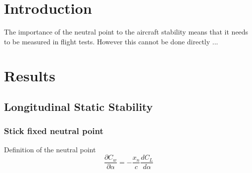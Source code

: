 \documentclass{article}
\begin{document}
\title{}
\author{lwp26}
\date{January 2025}
\maketitle

\section{Introduction}

The importance of the neutral point to the aircraft stability means that
it needs to be measured in flight tests.
However this cannot be done directly ...

\section{Results}

\subsection{Longitudinal Static Stability}
\subsubsection{Stick fixed neutral point}

Definition of the neutral point
\begin{equation}
    \frac{\partial C_w}{\partial \alpha} = - \frac{x_n}{c} \frac{dC_L}{d \alpha}
\end{equation}
\end{document}
